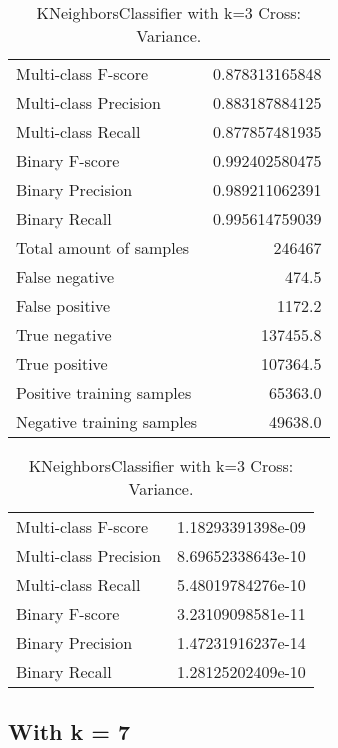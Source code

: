 \begin{table}[H]
\begin{minipage}{0.5\textwidth}
\caption{KNeighborsClassifier with k=3 Cross: Average.}
\centering
\begin{tabular}{l r}
\toprule
Multi-class F-score & 0.878313165848 \\
Multi-class Precision & 0.883187884125 \\
Multi-class Recall & 0.877857481935 \\
\midrule
Binary F-score & 0.992402580475 \\
Binary Precision & 0.989211062391 \\
Binary Recall & 0.995614759039 \\
\midrule
Total amount of samples & 246467 \\
False negative & 474.5 \\
False positive & 1172.2 \\
True negative & 137455.8 \\
True positive & 107364.5 \\
\midrule
Positive training samples & 65363.0 \\
Negative training samples & 49638.0 \\
\bottomrule
\end{tabular}
\end{minipage}
\hfillx
\begin{minipage}{0.5\textwidth}
\caption{KNeighborsClassifier with k=3 Cross: Variance.}
\centering
\begin{tabular}{l r}
\toprule
Multi-class F-score & 1.18293391398e-09 \\
Multi-class Precision & 8.69652338643e-10 \\
Multi-class Recall & 5.48019784276e-10 \\
\midrule
Binary F-score & 3.23109098581e-11 \\
Binary Precision & 1.47231916237e-14 \\
Binary Recall & 1.28125202409e-10 \\
\bottomrule
\end{tabular}
\end{minipage}
\end{table}

\newpage
\subsection{With k = 7}

